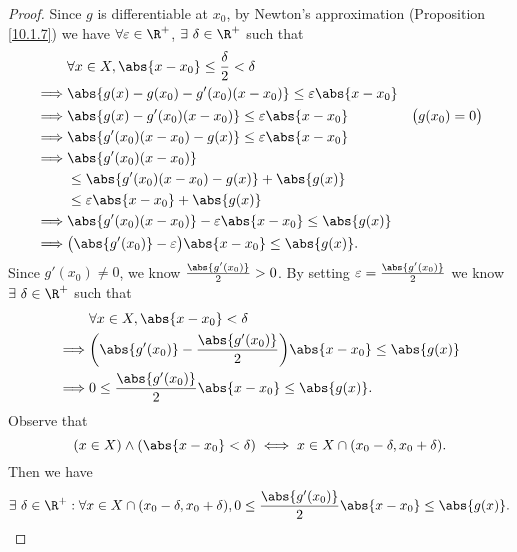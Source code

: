 \begin{proof}
    Since \(g\) is differentiable at \(x_0\), by Newton's approximation (Proposition \ref{10.1.7}) we have \(\forall \varepsilon \in \R^+\), \(\exists\ \delta \in \R^+\) such that
    \begin{align*}
                 & \forall x \in X, \abs{x - x_0} \leq \frac{\delta}{2} < \delta                                \\
        \implies & \abs{g(x) - g(x_0) - g'(x_0)(x - x_0)} \leq \varepsilon \abs{x - x_0}                        \\
        \implies & \abs{g(x) - g'(x_0)(x - x_0)} \leq \varepsilon \abs{x - x_0}          & \big(g(x_0) = 0\big) \\
        \implies & \abs{g'(x_0)(x - x_0) - g(x)} \leq \varepsilon \abs{x - x_0}                                 \\
        \implies & \abs{g'(x_0)(x - x_0)}                                                                       \\
                 & \leq \abs{g'(x_0)(x - x_0) - g(x)} + \abs{g(x)}                                              \\
                 & \leq \varepsilon \abs{x - x_0} + \abs{g(x)}                                                  \\
        \implies & \abs{g'(x_0)(x - x_0)} - \varepsilon \abs{x - x_0} \leq \abs{g(x)}                           \\
        \implies & \big(\abs{g'(x_0)} - \varepsilon\big)\abs{x - x_0} \leq \abs{g(x)}.
    \end{align*}
    Since \(g'(x_0) \neq 0\), we know \(\frac{\abs{g'(x_0)}}{2} > 0\).
    By setting \(\varepsilon = \frac{\abs{g'(x_0)}}{2}\) we know \(\exists\ \delta \in \R^+\) such that
    \begin{align*}
                 & \forall x \in X, \abs{x - x_0} < \delta                                           \\
        \implies & \bigg(\abs{g'(x_0)} - \frac{\abs{g'(x_0)}}{2}\bigg) \abs{x - x_0} \leq \abs{g(x)} \\
        \implies & 0 \leq \frac{\abs{g'(x_0)}}{2} \abs{x - x_0} \leq \abs{g(x)}.
    \end{align*}
    Observe that
    \[
        (x \in X) \land (\abs{x - x_0} < \delta) \iff x \in X \cap (x_0 - \delta, x_0 + \delta).
    \]
    Then we have
    \[
        \exists\ \delta \in \R^+ : \forall x \in X \cap (x_0 - \delta, x_0 + \delta), 0 \leq \frac{\abs{g'(x_0)}}{2} \abs{x - x_0} \leq \abs{g(x)}.
\]
\end{proof}
